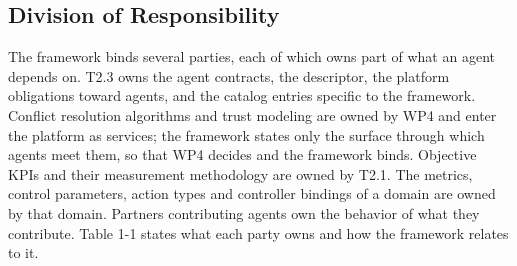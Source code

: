 \hypertarget{division-of-responsibility}{%
\subsection{Division of Responsibility}\label{division-of-responsibility}}

The framework binds several parties, each of which owns part of what an
agent depends on. T2.3 owns the agent contracts, the descriptor, the
platform obligations toward agents, and the catalog entries specific to
the framework. Conflict resolution algorithms and trust modeling are
owned by WP4 and enter the platform as services; the framework states
only the surface through which agents meet them, so that WP4 decides and
the framework binds. Objective KPIs and their measurement methodology
are owned by T2.1. The metrics, control parameters, action types and
controller bindings of a domain are owned by that domain. Partners
contributing agents own the behavior of what they contribute. Table 1-1
states what each party owns and how the framework relates to it.

